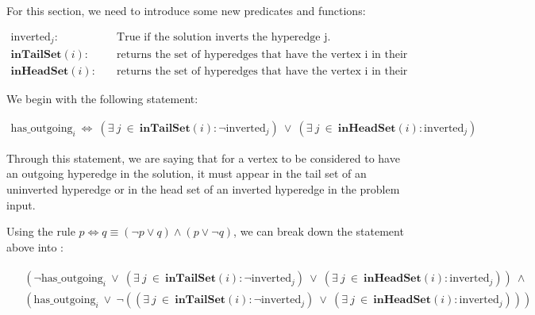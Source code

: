 For this section, we need to introduce some new predicates and functions:

\begin{align*}
    \text{inverted}_{j} : &\quad\text{True if the solution inverts the hyperedge j.}\\
    \textbf{inTailSet}(i) : &\quad\text{returns the set of  hyperedges that have the vertex i in their tail set.}\\
    \textbf{inHeadSet}(i) : &\quad\text{returns the set of  hyperedges that have the vertex i in their head set.}
\end{align*}

We begin with the following statement:

\begin{align}
    \text{has\_outgoing}_{i}~\iff~(\exists~j~\in~\textbf{inTailSet}(i): \lnot\text{inverted}_{j})~\vee~(\exists~j~\in~\textbf{inHeadSet}(i): \text{inverted}_{j})
\end{align}

Through this statement, we are saying that for a vertex to be considered to have an outgoing hyperedge in the solution, it must appear in the tail set of an uninverted hyperedge or in the head set of an inverted hyperedge in the problem input.

Using the rule $p\iff q \equiv (\lnot p \vee q) \land (p \vee \lnot q)$, we can break down the statement above into :

\begin{align}
    &\begin{aligned}
        (\lnot\text{has\_outgoing}_{i}~\vee~(\exists~j~\in~\textbf{inTailSet}(i): \lnot\text{inverted}_{j})~\vee~(\exists~j~\in~\textbf{inHeadSet}(i): \text{inverted}_{j}))~\land~\\ 
        (\text{has\_outgoing}_{i}~\vee~\lnot((\exists~j~\in~\textbf{inTailSet}(i): \lnot\text{inverted}_{j})~\vee~(\exists~j~\in~\textbf{inHeadSet}(i): \text{inverted}_{j})))    
    \end{aligned} 
\end{align}

